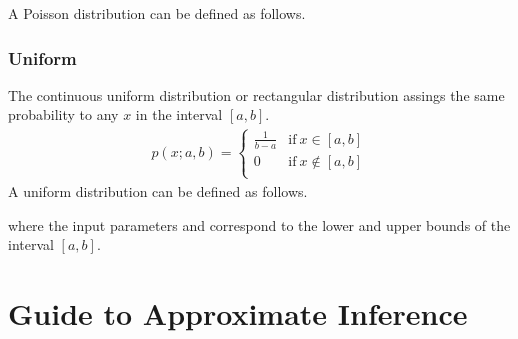 \documentclass[letterpaper,10pt,english]{sphinxmanual}
\begin{document}
A Poisson distribution can be defined as follows.

\begin{sphinxVerbatim}[commandchars=\\\{\}]
  


  
\end{sphinxVerbatim}


\subsection{Uniform}
\label{\detokenize{notes/guidemodels:uniform}}
The continuous uniform distribution or rectangular distribution assings the same probability to any \(x\)  in
the interval \([a,b]\).
\begin{equation*}
\begin{split}p(x;a,b) =\left\{\begin{array}{cc} \frac{1}{b-a} & \mathrm{if\ } x\in [a,b]\\
 0 & \mathrm{if\ } x\not\in [a,b] \\ \end{array} \right.\end{split}
\end{equation*}
A uniform distribution can be defined as follows.

\begin{sphinxVerbatim}[commandchars=\\\{\}]
   


\end{sphinxVerbatim}

where the input parameters  and  correspond to the lower and upper bounds of the interval \([a,b]\).


\chapter{Guide to Approximate Inference}
\label{\detokenize{notes/guideinference::doc}}\label{\detokenize{notes/guideinference:guide-to-approximate-inference}}
\end{document}

